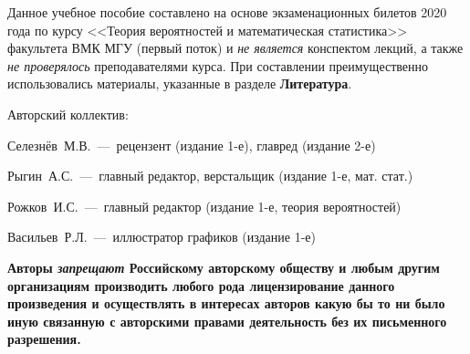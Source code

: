 


\renewcommand{\thepage}{\CoverName}

Данное учебное пособие составлено на основе экзаменационных билетов 2020 года по курсу <<Теория вероятностей и математическая статистика>> факультета ВМК МГУ (первый поток) и \textit{не является} конспектом лекций, а также \textit{не проверялось} преподавателями курса. 
При составлении преимущественно использовались материалы, указанные в разделе \textbf{Литература}.

\vspace{5mm}

Авторский коллектив:
\begin{compactlist}
    \item Селезнёв~М.В.~---~рецензент (издание 1-е), главред (издание 2-е)
    \item Рыгин~А.С.~---~главный редактор, верстальщик (издание 1-е, мат. стат.)
    \item Рожков~И.С.~---~главный редактор (издание 1-е, теория вероятностей)
    \item Васильев~Р.Л.~---~иллюстратор графиков (издание 1-е)
\end{compactlist}

\vspace{5mm}



\vspace{1cm}

\textbf{Авторы \textit{запрещают} Российскому авторскому обществу и любым другим организациям производить любого рода лицензирование данного произведения и осуществлять в интересах авторов какую бы то ни было иную связанную с авторскими правами деятельность без их письменного разрешения.}

\tableofcontents %

